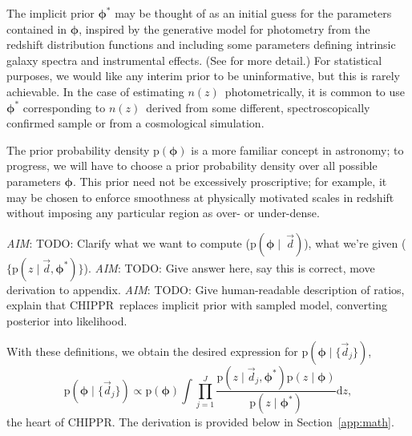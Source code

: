 \documentclass[iop]{emulateapj}
\newcommand{\todo}[3]{{\color{#2}\emph{#1}: #3}}
\newcommand{\aim}[1]{\todo{AIM}{red}{#1}}
\newcommand{\Sect}[1]{Section~\ref{#1}}
\newcommand{\project}[1]{{\textsc{#1}}}
\newcommand{\Chippr}{\project{CHIPPR}}
\newcommand{\nz}{$n(z)$}
\newcommand{\data}{\ensuremath{\vec{d}}}
\newcommand{\pr}[1]{\ensuremath{\mathrm{p}(#1)}}
\newcommand{\gvn}{\mid}%
\newcommand{\integral}[2]{\ensuremath{\int #1 \mathrm{d} #2}}
\newcommand{\pz}{photo-$z$~}
\newcommand{\bvec}[1]{\ensuremath{\boldsymbol{#1}}}
\newcommand{\ndphi}{\bvec{\phi}}
\begin{document}

The implicit prior $\ndphi^{*}$ may be thought of as an initial guess for the parameters contained in $\ndphi$, inspired by the generative model for photometry from the redshift distribution functions and including some parameters defining intrinsic galaxy spectra and instrumental effects. 
(See \citet{benitez_bayesian_2000} for more detail.)  
For statistical purposes, we would like any interim prior to be uninformative, but this is rarely achievable.  
In the case of estimating \nz\ photometrically, it is common to use $\ndphi^{*}$ corresponding to \nz\ derived from some different, spectroscopically confirmed sample or from a cosmological simulation.

The prior probability density $\pr{\ndphi}$ is a more familiar concept in astronomy; to progress, we will have to choose a prior probability density over all possible parameters $\ndphi$.
This prior need not be excessively proscriptive; for example, it may be chosen to enforce smoothness at physically motivated scales in redshift without imposing any particular region as over- or under-dense.

\aim{TODO: Clarify what we want to compute ($\pr{\ndphi \gvn\ \data}$), what we're given ($\{\pr{z \gvn \data, \ndphi^{*}}\}$).}
\aim{TODO: Give answer here, say this is correct, move derivation to appendix.}
\aim{TODO: Give human-readable description of ratios, explain that \Chippr\ replaces implicit prior with sampled model, converting posterior into likelihood.}

With these definitions, we obtain the desired expression for $\pr{\ndphi \gvn \{\data_{j}\}}$,
\begin{equation}
\label{eqn:fullpost}
\pr{\ndphi \gvn \{\data_{j}\}} \propto \pr{\ndphi} \integral{\prod_{j=1}^{J} \frac{\pr{z \gvn \data_{j}, \ndphi^{*}} \pr{z \gvn \ndphi}}{\pr{z \gvn \ndphi^{*}}}}{z},
\end{equation}
the heart of \Chippr.
The derivation is provided below in \Sect{app:math}.
\end{document}

